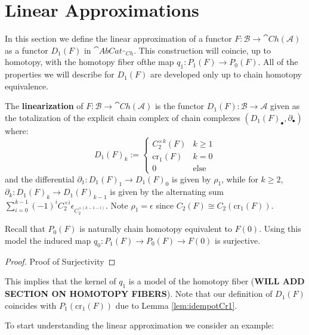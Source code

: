 \section{Linear Approximations}


In this section we define the linear approximation of a functor $F:\mathcal{B}\rightarrow \cat{Ch}(\mathcal{A})$ as a functor $D_1(F)$ in $\cat{AbCat}_{\cat{Ch}}$. This construction will coincie, up to homotopy, with the homotopy fiber ofthe map $q_1:P_1(F)\to P_0(F)$. All of the properties we will describe for $D_1(F)$ are developed only up to  chain homotopy equivalence.

\begin{defn}[label=defn:linearization]
    The \textbf{linearization} of $F:\mathcal{B}\rightarrow \cat{Ch}(\mathcal{A})$ is the functor $D_1(F):\mathcal{B}\rightarrow \mathcal{A}$ given as the totalization of the explicit chain complex of chain complexes $(D_1(F)_\bullet,\partial_\bullet)$ where:
    \begin{equation*}
        D_1(F)_k := \left\{\begin{array}{cc} C_2^{\times k}(F) & k \geq 1 \\ \text{cr}_1(F) & k = 0 \\ 0 & \text{else} \end{array}\right.
    \end{equation*}
    and the differential $\partial_1:D_1(F)_1\rightarrow D_1(F)_0$ is given by $\rho_1$, while for $k \geq 2$, $\partial_k:D_1(F)_k\rightarrow D_1(F)_{k-1}$ is given by the alternating sum $\sum_{i=0}^{k-1}(-1)^iC_2^{\times i}\epsilon_{C_2^{\times (k-1-i)}}$. Note $\rho_1 = \epsilon$ since $C_2(F) \cong C_2(\text{cr}_1(F))$.
\end{defn}

Recall that $P_0(F)$ is naturally chain homotopy equivalent to $F(0)$. Using this model the induced map $q_0:P_1(F)\to P_0(F)\to F(0)$ is surjective.

\begin{proof}{Proof of Surjectivity}

\end{proof}

This implies that the kernel of $q_1$ is a model of the homotopy fiber (\textbf{WILL ADD SECTION ON HOMOTOPY FIBERS}). Note that our definition of $D_1(F)$ coincides with $P_1(\text{cr}_1(F))$ due to Lemma \ref{lem:idempotCr1}. 

To start understanding the linear approximation we consider an example:

